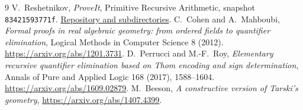 \documentclass[11pt,letterpaper]{article}
\theoremstyle{definition}
\begin{document}
\par\vspace{7pt}
\clearpage








\begin{thebibliography}{9}
 V.~Reshetnikov, \emph{ProveIt}, Primitive Recursive
Arithmetic, snapshot \texttt{83421593771f}.
\href{https://github.com/VladimirReshetnikov/ProveIt/tree/83421593771f877bc1ae98f4229eb35507bff05b/Logic/PrimitiveRecursiveArithmetic}{Repository and subdirectories}.
 C.~Cohen and A.~Mahboubi, \emph{Formal proofs in real algebraic
geometry: from ordered fields to quantifier elimination}, Logical Methods
in Computer Science 8 (2012).
\url{https://arxiv.org/abs/1201.3731}.
 D.~Perrucci and M.-F.~Roy, \emph{Elementary recursive
quantifier elimination based on Thom encoding and sign determination},
Annals of Pure and Applied Logic 168 (2017), 1588--1604.
\url{https://arxiv.org/abs/1609.02879}.
 M.~Beeson, \emph{A constructive version of Tarski's
geometry}, \url{https://arxiv.org/abs/1407.4399}.
\end{thebibliography}
\end{document}
